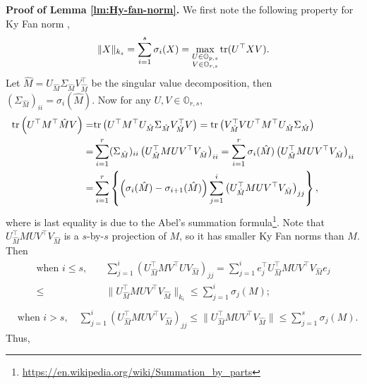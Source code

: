 \documentclass[11pt]{article}
\newcommand{\0}{{\mathbf{0}}}
\newcommand{\1}{{\mathbf{1}}}
\newcommand{\V}{{\rm V}}
\newcommand{\tr}{{\rm tr}}
\begin{document}
{\bf\noindent Proof of Lemma \ref{lm:Hy-fan-norm}.} We first note the following property for Ky Fan norm \citep{fan1950theorem},
$$\|X\|_{k_s} = \sum_{i=1}^s \sigma_i(X) = \max_{\substack{U\in \mathbb{O}_{p, s}\\V\in \mathbb{O}_{r, s}}} \tr(U^\top XV).$$
Let $\hat{M} = U_{\hat{M}}\Sigma_{\hat{M}}V_{\hat{M}}^\top$ be the singular value decomposition, then $(\Sigma_{\hat{M}})_{ii} = \sigma_i(\hat{M})$. Now for any $U, V \in \mathbb{O}_{r, s}$,
\begin{equation*}
\begin{split}
\tr\left(U^\top M^\top \hat{M} V\right) = & \tr\left(U^\top M^\top U_{\hat{M}}\Sigma_{\hat{M}}V_{\hat{M}}^\top V\right) = \tr\left(V_{\hat{M}}^\top V U^\top M^\top U_{\hat{M}}\Sigma_{\hat{M}} \right)\\
= & \sum_{i=1}^r (\Sigma_{\hat{M}})_{ii} \left(U_{\hat{M}}^\top M U V^\top V_{\hat{M}}\right)_{ii} =  \sum_{i=1}^r \sigma_i(\hat{M}) \left(U_{\hat{M}}^\top M U V^\top V_{\hat{M}}\right)_{ii}\\
= & \sum_{i=1}^r\left\{\left(\sigma_i(\hat{M}) - \sigma_{i+1}(\hat{M})\right) \sum_{j=1}^i \left(U_{\hat{M}}^\top M U V^\top V_{\hat{M}}\right)_{jj}\right\},
\end{split}
\end{equation*}
where is last equality is due to the Abel's summation formula\footnote{\url{https://en.wikipedia.org/wiki/Summation_by_parts}}. Note that $U_{\hat{M}}^\top M U V^\top V_{\hat{M}}$ is a $s$-by-$s$ projection of $M$, so it has smaller Ky Fan norms than $M$. Then
\begin{equation*}
\begin{split}
\text{when } i\leq s, \quad & \sum_{j=1}^{i}\left(U_{\hat{M}}^\top M V^\top U  V_{\hat{M}}\right)_{jj} = \sum_{j=1}^i e_j^\top U_{\hat{M}}^\top M U V^\top V_{\hat{M}} e_j \\
\leq & \| U_{\hat{M}}^\top M U V^\top V_{\hat{M}}\|_{k_i} \leq \sum_{j=1}^i\sigma_j(M);\\
\end{split}
\end{equation*}
\begin{equation*}
\begin{split}
& \text{when } i>s, \quad \sum_{j=1}^{i}\left(U_{\hat{M}}^\top M U V^\top V_{\hat{M}}\right)_{jj} \leq \|U_{\hat{M}}^\top M U V^\top V_{\hat{M}}\| \leq \sum_{j=1}^s \sigma_j(M).
\end{split}
\end{equation*}
Thus,
\end{document}

